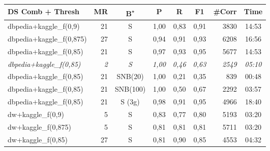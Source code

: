 \documentclass[11pt,titlepage,oneside,openany]{article}
\begin{document}
\begin{table}[]
	\small
	\begin{tabular}{lrcrrrrc}
		DS Comb + Thresh                 & \multicolumn{1}{c}{MR} & B\textsuperscript{$\star$}          & \multicolumn{1}{c}{P} & \multicolumn{1}{c}{R} & \multicolumn{1}{c}{F1} & \multicolumn{1}{c}{\#Corr} & Time           \\\hline
		dbpedia+kaggle\_f(0,9)           & 21                     & S          & 1,00                  & 0,83                  & 0,91                   & 3830                       & 14:53          \\
		dbpedia+kaggle\_f(0,875)         & 27                     & S          & 0,94                  & 0,91                  & 0,93                   & 6208                       & 16:56          \\
		dbpedia+kaggle\_f(0,85)          & 21                     & S          & 0,97                  & 0,93                  & 0,95                   & 5677                       & 14:53          \\
		\textit{dbpedia+kaggle\_f(0,85)} & \textit{2}             & \textit{S} & \textit{1,00}         & \textit{0,46}         & \textit{0,63}          & \textit{2549}              & \textit{05:10} \\
		dbpedia+kaggle\_f(0,85)          & 21                     & SNB(20)    & 1,00                  & 0,21                  & 0,35                   & 839                        & 00:48          \\
		dbpedia+kaggle\_f(0,85)          & 21                     & SNB(100)   & 1,00                  & 0,50                  & 0,67                   & 2292                       & 03:57          \\
		dbpedia+kaggle\_f(0,85)          & 21                     & S (3g)     & 0,98                  & 0,91                  & 0,95                   & 4966                       & 18:40          \\\hdashline
		dw+kaggle\_f(0,9)                & 5                      & S          & 0,83                  & 0,77                  & 0,80                   & 5193                       & 03:20          \\
		dw+kaggle\_f(0,875)              & 5                      & S          & 0,81                  & 0,81                  & 0,81                   & 5711                       & 03:20          \\
		dw+kaggle\_f(0,85)      & 27           & S & 0,81        & 0,90         & 0,85          & 4553             & 04:32 \\

\end{tabular}
\end{table}
\end{document}

